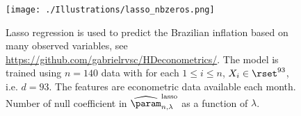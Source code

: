 \begin{figure}
\begin{center}
\texttt{[image: ./Illustrations/lasso\_nbzeros.png]}
\end{center}
\caption{Lasso regression is used to predict the Brazilian inflation based on many observed variables, see \url{https://github.com/gabrielrvsc/HDeconometrics/}. The model is trained using $n=140$ data with for each $1\leqslant i \leqslant n$, $X_i\in\rset^{93}$, i.e. $d  =93$. The features are econometric data available each month. Number of null coefficient in $\widehat \param^{\mathrm{lasso}}_{n,\lambda}$ as a function of $\lambda$.}
\end{figure}
